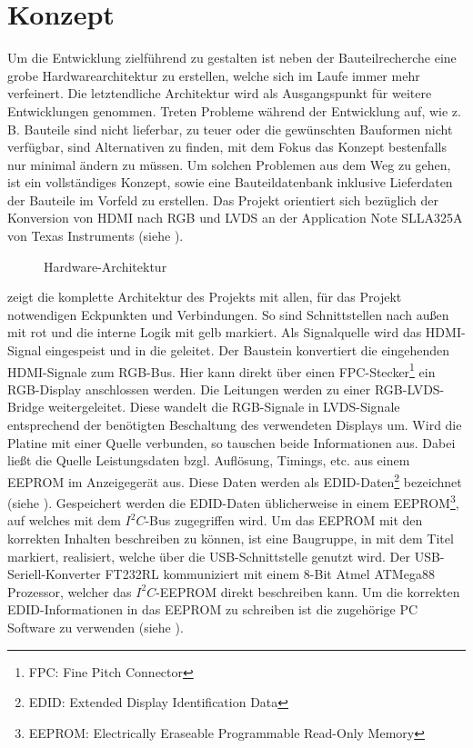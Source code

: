 \section{Konzept}
\label{sec:TeilB_Konzept}
Um die Entwicklung zielführend zu gestalten ist neben der Bauteilrecherche eine grobe Hardwarearchitektur zu erstellen, welche sich im Laufe immer mehr verfeinert. Die letztendliche Architektur wird als Ausgangspunkt für weitere Entwicklungen genommen. Treten Probleme während der Entwicklung auf, wie z. B. Bauteile sind nicht lieferbar, zu teuer oder die gewünschten Bauformen nicht verfügbar, sind Alternativen zu finden, mit dem Fokus das Konzept bestenfalls nur minimal ändern zu müssen. Um solchen Problemen aus dem Weg zu gehen, ist ein vollständiges Konzept, sowie eine Bauteildatenbank inklusive Lieferdaten der Bauteile im Vorfeld zu erstellen. Das Projekt orientiert sich bezüglich der Konversion von HDMI nach RGB und LVDS an der Application Note SLLA325A von Texas Instruments (siehe \cite{TI2011}).
\begin{figure}[htp]
	\centering
{}
	\caption{Hardware-Architektur}
	\label{fig:teilb_architektur}
\end{figure}

 zeigt die komplette Architektur des Projekts mit allen, für das Projekt notwendigen Eckpunkten und Verbindungen. So sind Schnittstellen nach außen mit rot und die interne Logik mit gelb markiert. Als Signalquelle wird das HDMI-Signal eingespeist und in die  geleitet. Der Baustein  konvertiert die eingehenden HDMI-Signale zum RGB-Bus. Hier kann direkt über einen FPC-Stecker\footnote{FPC: Fine Pitch Connector} ein RGB-Display anschlossen werden. Die Leitungen werden zu einer RGB-LVDS-Bridge weitergeleitet. Diese wandelt die RGB-Signale in LVDS-Signale entsprechend der benötigten Beschaltung des verwendeten Displays um. Wird die Platine mit einer Quelle verbunden, so tauschen beide Informationen aus. Dabei ließt die Quelle Leistungsdaten bzgl. Auflösung, Timings, etc. aus einem EEPROM  im Anzeigegerät aus. Diese Daten werden als EDID-Daten\footnote{EDID: Extended Display Identification Data} bezeichnet (siehe \cite{edid2000}). Gespeichert werden die EDID-Daten üblicherweise in einem EEPROM\footnote{EEPROM: Electrically Eraseable Programmable Read-Only Memory}, auf welches mit dem $I^2C$-Bus zugegriffen wird. Um das EEPROM mit den korrekten Inhalten beschreiben zu können, ist eine Baugruppe, in  mit dem Titel  markiert, realisiert, welche über die USB-Schnittstelle genutzt wird. Der USB-Seriell-Konverter FT232RL kommuniziert mit einem 8-Bit Atmel ATMega88 Prozessor, welcher das $I^2C$-EEPROM direkt beschreiben kann. Um die korrekten EDID-Informationen in das EEPROM zu schreiben ist die zugehörige PC Software zu verwenden (siehe ).\newpage